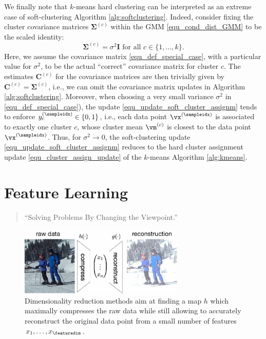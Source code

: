 \documentclass[12pt]{report}
\begin{document}
We finally note that $k$-means hard clustering can be interpreted as an extreme case of 
soft-clustering Algorithm \ref{alg:softclustering}. Indeed, consider fixing the cluster 
covariance matrices $ {\bm \Sigma}^{(c)}$ within the GMM \eqref{equ_cond_dist_GMM} 
to be the scaled identity: 
\begin{equation}
\label{equ_def_special_case}
 {\bm \Sigma}^{(c)}= \sigma^{2} \mathbf{I} \mbox{ for all } c \in \{1,\ldots,k\}.  
\end{equation} 
Here, we assume the covariance matrix \eqref{equ_def_special_case}, with a particular value 
for $\sigma^{2}$, to be the actual ``correct'' covariance matrix for cluster $c$. The estimates 
$\mathbf{C}^{(c)}$ for the covariance matrices are then trivially given by $\mathbf{C}^{(c)} =  {\bm \Sigma}^{(c)}$, 
i.e., we can omit the covariance matrix updates in Algorithm \ref{alg:softclustering}. Moreover, when 
choosing a very small variance $\sigma^{2}$ in \eqref{equ_def_special_case}), the update 
\eqref{equ_update_soft_cluster_assignm} tends to enforce $y_{c}^{(\sampleidx)} \in \{0,1\}$, i.e., 
each data point $\vx^{(\sampleidx)}$ is associated to exactly one cluster $c$, whose cluster mean 
$\vm^{(c)}$ is closest to the data point $\vx^{(\sampleidx)}$. Thus, for $\sigma^{2} \rightarrow 0$, 
the soft-clustering update \eqref{equ_update_soft_cluster_assignm} reduces to the hard cluster 
assignment update \eqref{equ_cluster_assign_update} of the $k$-means Algorithm \ref{alg:kmeans}. 

\newpage
\chapter{Feature Learning} 
\label{ch_FeatureLearning}

\begin{quote}
``Solving Problems By Changing the Viewpoint.''
\end{quote}

\begin{figure}[htbp]
\begin{center}
\includegraphics[width=0.7\textwidth]{DimRed.jpg}  
\end{center}
\caption{Dimensionality reduction methods aim at finding a map $h$ which maximally 
	compresses the raw data while still allowing to accurately reconstruct the original 
	data point from a small number of features $x_{1},\ldots,x_{\featuredim}$.}
\label{fig_dimred}
\end{figure}
\end{document}
